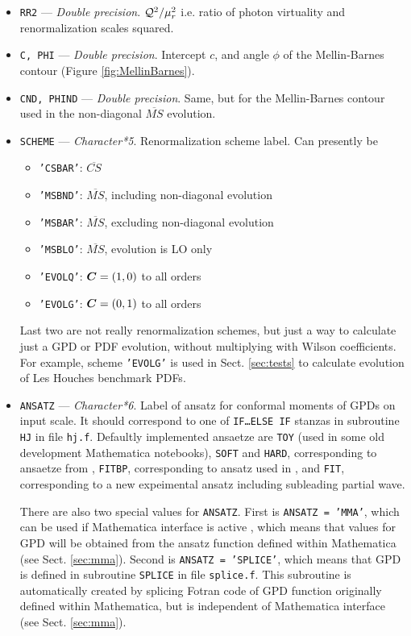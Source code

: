 \documentclass[12pt]{article}
\begin{document}
\begin{itemize}
\item
\texttt{RR2} --- \emph{Double precision}. $ {\cal Q}^2/{\mu_{r}^2}$ i.e. ratio
of photon virtuality and renormalization scales squared.

\item
\texttt{C, PHI} --- \emph{Double precision}. Intercept $c$, and angle $\phi$ of
the Mellin-Barnes contour (Figure \ref{fig:MellinBarnes}).

\item
\texttt{CND, PHIND} --- \emph{Double precision}. Same, but for 
the Mellin-Barnes contour used in the non-diagonal $\overline{MS}$ evolution.

\item
\texttt{SCHEME} --- \emph{Character*5}. Renormalization scheme label. 
Can presently be 
\begin{itemize}
\item \texttt{'CSBAR'}: $\overline{CS}$
\item \texttt{'MSBND'}: $\overline{MS}$, including non-diagonal evolution
\item \texttt{'MSBAR'}: $\overline{MS}$, excluding non-diagonal evolution
\item \texttt{'MSBLO'}: $\overline{MS}$, evolution is LO only
\item \texttt{'EVOLQ'}: $\mbox{\boldmath $C$} = (1,0)$ to all orders
\item \texttt{'EVOLG'}: $\mbox{\boldmath $C$} = (0,1)$ to all orders
\end{itemize}
Last two are not really renormalization schemes, but just a way to calculate
just a GPD or PDF evolution, without multiplying with Wilson coefficients.
For example, scheme \texttt{'EVOLG'} is used in Sect. \ref{sec:tests} to calculate
evolution of Les Houches benchmark PDFs.

\item
\texttt{ANSATZ} --- \emph{Character*6}. Label of ansatz for conformal moments of GPDs on input scale. 
It should correspond to one of  \texttt{IF\ldots ELSE IF} stanzas in subroutine
\texttt{HJ} in file \texttt{hj.f}. Defaultly implemented ansaetze are
\texttt{TOY} (used in some old development Mathematica notebooks), \texttt{SOFT} and \texttt{HARD},
corresponding to ansaetze from \cite{Kumericki:2006xx}, \texttt{FITBP}, corresponding
to ansatz used in \cite{Kumericki:2007sa}, and \texttt{FIT}, corresponding to a new
expeimental ansatz including subleading partial wave.

There are also two special values for \texttt{ANSATZ}. First is \texttt{ANSATZ = 'MMA'}, which
can be used if Mathematica interface is active , which
means that values for GPD will be obtained from the ansatz function defined within
Mathematica (see Sect. \ref{sec:mma}). Second is \texttt{ANSATZ = 'SPLICE'}, which
means that GPD is defined in subroutine \texttt{SPLICE} in file \texttt{splice.f}. This
subroutine is automatically created by splicing Fotran code of GPD function originally
defined within Mathematica, but is independent of Mathematica interface (see Sect. \ref{sec:mma}).

\end{itemize}
\end{document}
